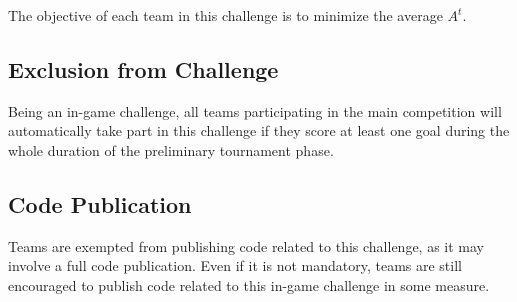 The objective of each team in this challenge is to minimize the average $A^t$.

\subsection{Exclusion from Challenge}
Being an in-game challenge, all teams participating in the main competition will automatically take part in this challenge if they score at least one goal during the whole duration of the preliminary tournament phase.

\subsection{Code Publication}
Teams are exempted from publishing code related to this challenge, as it may involve a full code publication. Even if it is not mandatory, teams are still encouraged to publish code related to this in-game challenge in some measure.
